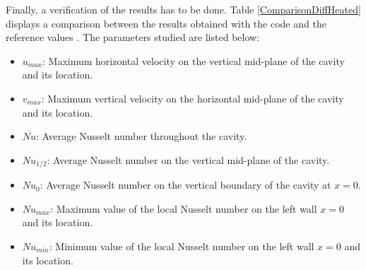 Finally, a verification of the results has to be done. Table \ref{ComparisonDiffHeated} displays a comparison between the results obtained with the code and the reference values \cite{DeVahlDavis1983}. The parameters studied are listed below:
\begin{itemize}
	\item $u_{max}$: Maximum horizontal velocity on the vertical mid-plane of the cavity and its location.
	\item $v_{max}$: Maximum vertical velocity on the horizontal mid-plane of the cavity and its location.
	\item $\overbar{Nu}$: Average Nusselt number throughout the cavity.
	\item $Nu_{1/2}$: Average Nusselt number on the vertical mid-plane of the cavity.
	\item $Nu_{0}$: Average Nusselt number on the vertical boundary of the cavity at $x=0$.
	\item $Nu_{max}$: Maximum value of the local Nusselt number on the left wall $x=0$ and its location.
	\item $Nu_{min}$: Minimum value of the local Nusselt number on the left wall $x=0$ and its location.
\end{itemize}
